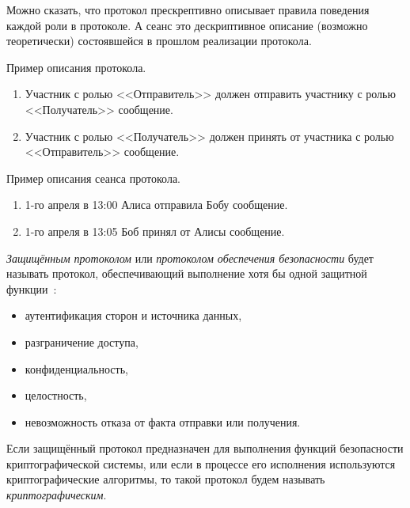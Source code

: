 Можно сказать, что протокол прескрептивно описывает правила поведения каждой роли в протоколе. А сеанс это дескриптивное описание (возможно теоретически) состоявшейся в прошлом реализации протокола.

Пример описания протокола.
\begin{enumerate}
	\item Участник с ролью <<Отправитель>> должен отправить участнику с ролью <<Получатель>> сообщение.
	\item Участник с ролью <<Получатель>> должен принять от участника с ролью <<Отправитель>> сообщение.
\end{enumerate}

Пример описания сеанса протокола.
\begin{enumerate}
	\item 1-го апреля в 13:00 Алиса отправила Бобу сообщение.
	\item 1-го апреля в 13:05 Боб принял от Алисы сообщение.
\end{enumerate}

\emph{Защищённым протоколом} или \emph{протоколом обеспечения безопасности} будет называть протокол, обеспечивающий выполнение хотя бы одной защитной функции~\cite{ISO:7498-2:1989}:
\begin{itemize}
	\item аутентификация сторон и источника данных,
	\item разграничение доступа,
	\item конфиденциальность,
	\item целостность,
	\item невозможность отказа от факта отправки или получения.
\end{itemize}

Если защищённый протокол предназначен для выполнения функций безопасности криптографической системы, или если в процессе его исполнения используются криптографические алгоритмы, то такой протокол будем называть \emph{криптографическим}.
